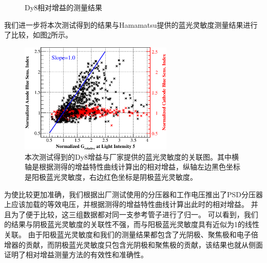 \begin{figure}[htbp]
	\centering
	\caption{Dy8相对增益的测量结果}
	\label{fig:pmt_test:gain_results}
\end{figure}

我们进一步将本次测试得到的结果与Hamamatsu提供的蓝光灵敏度测量结果进行了比较，如图\ref{fig:pmt_test:gain_vs_bluesensitivity}所示。
\begin{figure}[htbp]
	\centering
	\includegraphics[width=0.65\textwidth]{chap/pmt_test/fig/gain_vs_bluesensitivity.eps}
	\caption{本次测试得到的Dy8增益与厂家提供的蓝光灵敏度的关联图。其中横轴是根据测得的增益特性曲线计算出的相对增益，纵轴左边黑色坐标是阳极蓝光灵敏度，右边红色坐标是阴极蓝光灵敏度。}
	\label{fig:pmt_test:gain_vs_bluesensitivity}
\end{figure}
为使比较更加准确，我们根据出厂测试使用的分压器和工作电压推出了PSD分压器上应该加载的等效电压，并根据测得的增益特性曲线计算出此时的相对增益。
并且为了便于比较，这三组数据都对同一支参考管子进行了归一。
可以看到，我们的结果与阴极蓝光灵敏度的关联性不强，而与阳极蓝光灵敏度具有近似为1的线性关联。
由于阳极蓝光灵敏度和我们的测量结果都包含了光阴极、聚焦极和电子倍增器的贡献，而阴极蓝光灵敏度只包含光阴极和聚焦极的贡献，该结果也就从侧面证明了相对增益测量方法的有效性和准确性。

